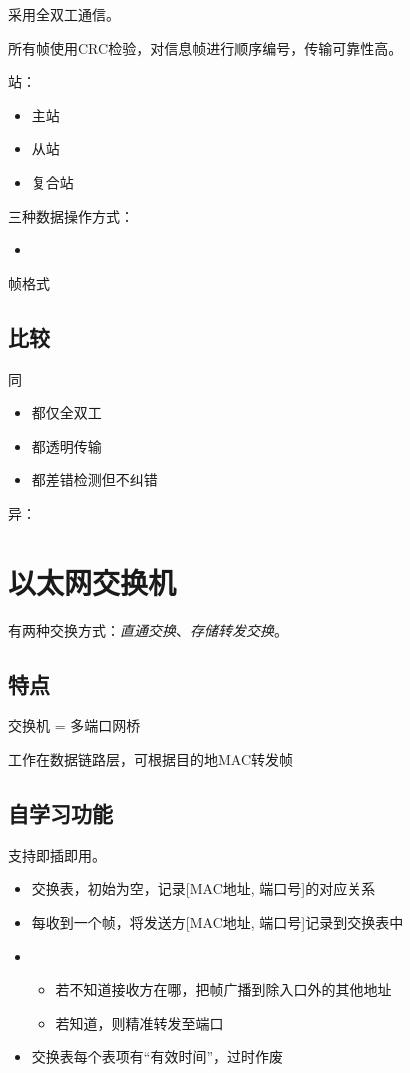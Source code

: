 采用全双工通信。

所有帧使用CRC检验，对信息帧进行顺序编号，传输可靠性高。

站：\begin{itemize}
    \item 主站
    \item 从站
    \item 复合站
\end{itemize}

三种数据操作方式：\begin{itemize}
    \item 
\end{itemize}

帧格式


\subsection{比较}
同\begin{itemize}
    \item 都仅全双工
    \item 都透明传输
    \item 都差错检测但不纠错
\end{itemize}

异：


\section{以太网交换机}

有两种交换方式：\textit{直通交换}、\textit{存储转发交换}。

\subsection{特点}
交换机 = 多端口网桥

工作在数据链路层，可根据目的地MAC转发帧


\subsection{自学习功能}
支持即插即用。

\begin{itemize}
    \item 交换表，初始为空，记录[MAC地址, 端口号]的对应关系
    \item 每收到一个帧，将发送方[MAC地址, 端口号]记录到交换表中
    \item \begin{itemize}
        \item 若不知道接收方在哪，把帧广播到除入口外的其他地址
        \item 若知道，则精准转发至端口
    \end{itemize}
    \item 交换表每个表项有“有效时间”，过时作废
\end{itemize}


